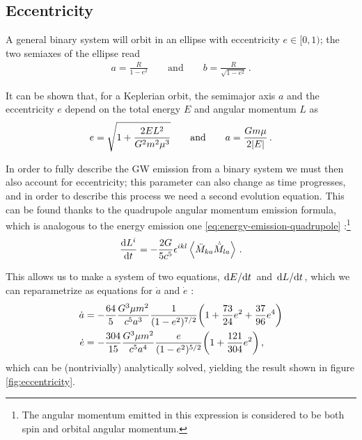 \documentclass[main.tex]{subfiles}
\begin{document}
\subsection{Eccentricity}

A general binary system will orbit in an ellipse with eccentricity \(e \in [0, 1)\); the two semiaxes of the ellipse read \cite[eqs.\ 4.51]{maggioreGravitationalWavesVolume2007}
%
\begin{align}
a = \frac{R}{1- e^2} \qquad \text{and} \qquad
b = \frac{R}{\sqrt{1 - e^2}}
\,.
\end{align}

It can be shown that, for a Keplerian orbit, the semimajor axis \(a\) and the eccentricity \(e\) depend on the total energy \(E\) and angular momentum \(L\) as \cite[eqs.\ 4.50, 4.53]{maggioreGravitationalWavesVolume2007}
%
\begin{align}
e = \sqrt{1 + \frac{2 EL^2}{G^2 m^2 \mu^3}} 
\qquad \text{and} \qquad
a = \frac{Gm \mu }{2 \abs{E}}
\,.
\end{align}

In order to fully describe the \ac{GW} emission from a binary system we must then also account for eccentricity; this parameter can also change as time progresses, and in order to describe this process we need a second evolution equation.
This can be found thanks to the quadrupole angular momentum emission formula, which is analogous to the energy emission one \eqref{eq:energy-emission-quadrupole} \cite[eq.\ 3.99]{maggioreGravitationalWavesVolume2007}:\footnote{The angular momentum emitted in this expression is considered to be both spin and orbital angular momentum.} 
%
\begin{align}
\dv{L^{i}}{t} = - \frac{2G}{5c^{5}} \epsilon^{ikl} \expval{ \ddot{M}_{ka} \dot{\ddot{M}}_{la}} 
\,.
\end{align}

This allows us to make a system of two equations, \(\dv*{E}{t}\) and \(\dv*{L}{t}\), which we can reparametrize as equations for \(\dot{a}\) and \(\dot{e}\) \cite[eqs.\ 4.116--17]{maggioreGravitationalWavesVolume2007}: 
%
\begin{subequations}
\begin{align}
\dot{a} &= - \frac{64}{5} \frac{G^3 \mu m^2}{c^{5} a^3}
\frac{1}{(1-e^2)^{7/2}} \qty(1 + \frac{73}{24} e^2 + \frac{37}{96}e^{4})  \\
\dot{e} &= - \frac{304}{15}  \frac{G^3 \mu m^2}{c^{5} a^4} 
\frac{e}{(1-e^2)^{5/2}} \qty(1 + \frac{121}{304} e^2)
\,,
\end{align}
\end{subequations}
%
which can be (nontrivially) analytically solved, yielding the result shown in figure \ref{fig:eccentricity}. 
\end{document}
